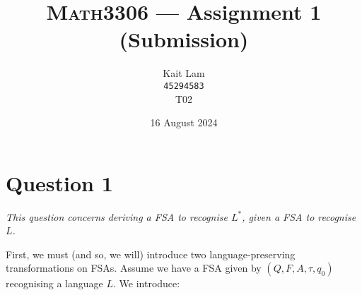\documentclass[a4paper]{article}
\author{Kait Lam \\ \small \texttt{45294583} \\ \small {T02}}
\title{\textsc{Math3306} --- Assignment 1 (Submission)}
\date{16 August 2024}
\begin{document}
\maketitle


\section*{Question 1}
\begin{center}
  \textit{This question concerns deriving a FSA to recognise $L^*$, given a FSA to recognise $L$.}
\end{center}

\noindent First, we must (and so, we will)
introduce two language-preserving transformations on FSAs.
Assume we have a FSA given by $(Q, F, A, \tau, q_0)$ recognising a language $L$.
We introduce:
\end{document}
